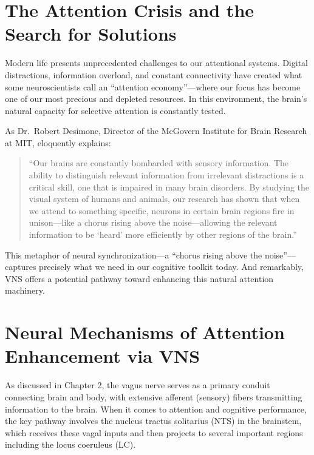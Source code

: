 \documentclass[
  Letterpaper,
]{scrbook}
\begin{document}
\section{The Attention Crisis and the Search for
Solutions}\label{the-attention-crisis-and-the-search-for-solutions}

Modern life presents unprecedented challenges to our attentional
systems. Digital distractions, information overload, and constant
connectivity have created what some neuroscientists call an ``attention
economy''---where our focus has become one of our most precious and
depleted resources. In this environment, the brain's natural capacity
for selective attention is constantly tested.

As Dr.~Robert Desimone, Director of the McGovern Institute for Brain
Research at MIT, eloquently explains:

\begin{quote}
``Our brains are constantly bombarded with sensory information. The
ability to distinguish relevant information from irrelevant distractions
is a critical skill, one that is impaired in many brain disorders. By
studying the visual system of humans and animals, our research has shown
that when we attend to something specific, neurons in certain brain
regions fire in unison---like a chorus rising above the noise---allowing
the relevant information to be `heard' more efficiently by other regions
of the brain.''
\end{quote}

This metaphor of neural synchronization---a ``chorus rising above the
noise''---captures precisely what we need in our cognitive toolkit
today. And remarkably, VNS offers a potential pathway toward enhancing
this natural attention machinery.

\section{Neural Mechanisms of Attention Enhancement via
VNS}\label{neural-mechanisms-of-attention-enhancement-via-vns}

As discussed in Chapter 2, the vagus nerve serves as a primary conduit
connecting brain and body, with extensive afferent (sensory) fibers
transmitting information to the brain. When it comes to attention and
cognitive performance, the key pathway involves the nucleus tractus
solitarius (NTS) in the brainstem, which receives these vagal inputs and
then projects to several important regions including the locus coeruleus
(LC).
\end{document}
